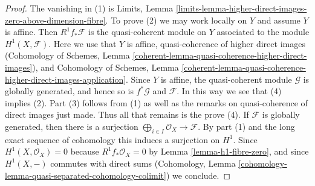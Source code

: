 \documentclass[10pt,a4paper]{amsart}
\theoremstyle{plain}
\theoremstyle{definition}
\theoremstyle{remark}
\numberwithin{equation}{subsection}
\begin{document}
\begin{proof}
The vanishing in (1) is Limits, Lemma
\ref{limits-lemma-higher-direct-images-zero-above-dimension-fibre}.
To prove (2) we may work locally on $Y$ and assume $Y$ is affine.
Then $R^1f_*\mathcal{F}$ is the quasi-coherent module on $Y$
associated to the module $H^1(X, \mathcal{F})$.
Here we use that $Y$ is affine, quasi-coherence of higher direct
images (Cohomology of Schemes, Lemma
\ref{coherent-lemma-quasi-coherence-higher-direct-images}), and
Cohomology of Schemes, Lemma
\ref{coherent-lemma-quasi-coherence-higher-direct-images-application}.
Since $Y$ is affine, the quasi-coherent module $\mathcal{G}$
is globally generated, and hence so is $f^*\mathcal{G}$
and $\mathcal{F}$.
In this way we see that (4) implies (2).
Part (3) follows from (1) as well as the remarks on
quasi-coherence of direct images just made. Thus
all that remains is the prove (4).
If $\mathcal{F}$ is globally generated, then there is a surjection
$\bigoplus_{i \in I} \mathcal{O}_X \to \mathcal{F}$. By part (1)
and the long exact sequence of cohomology this
induces a surjection on $H^1$. Since $H^1(X, \mathcal{O}_X) = 0$
because $R^1f_*\mathcal{O}_X = 0$ by
Lemma \ref{lemma-h1-fibre-zero}, and
since $H^1(X, -)$ commutes with direct sums
(Cohomology, Lemma \ref{cohomology-lemma-quasi-separated-cohomology-colimit})
we conclude.
\end{proof}
\end{document}
